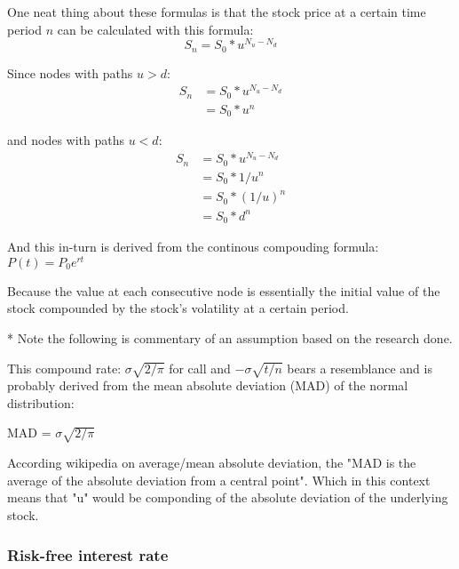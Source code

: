 \documentclass[12pt, letterpaper]{article}
\begin{document}
One neat thing about these formulas is that the stock price at a certain time period ${n}$ can be calculated with this formula:
\begin{equation*}
  {S}_n = {S}_0 * {u}^{N_u-N_d}
\end{equation*}

Since nodes with paths ${u > d}$:
\begin{equation*}
  \begin{split}
    {S}_n
    & = {S}_0 * {u}^{N_u-N_d} \\
    & = {S}_0 * {u}^n
  \end{split}
\end{equation*}

and nodes with paths ${u < d}$:
\begin{equation*}
  \begin{split}
    {S}_n
    & = {S}_0 * {u}^{N_u-N_d} \\
    & = {S}_0 * {1/u^n} \\
    & = {S}_0 * ({1/u})^n \\
    & = {S}_0 * {d^n}
  \end{split}
\end{equation*}

And this in-turn is derived from the continous compouding formula: %
${P(t)} = {P}_{0}e^{rt}$

Because the value at each consecutive node is essentially the initial value of the stock compounded by the stock's volatility at a certain period.

* Note the following is commentary of an assumption based on the research done.

This compound rate: ${\sigma\sqrt{2/\pi}}$ for call and ${-\sigma\sqrt{t/n}}$ bears a resemblance and is probably derived from the mean absolute deviation (MAD) of the normal distribution:

MAD = ${\sigma\sqrt{2/\pi}}$

According wikipedia on average/mean absolute deviation, the "MAD is the average of the absolute deviation from a central point".
Which in this context means that "u" would be componding of the absolute deviation of the underlying stock.

\subsubsection*{Risk-free interest rate}
\end{document}
